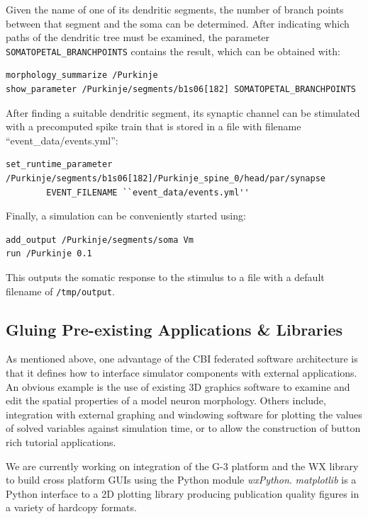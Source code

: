\documentclass[12pt]{article}
\begin{document}
Given the name of one of its dendritic segments, the number of branch
points between that segment and the soma can be determined. After
indicating which paths of the dendritic tree must be examined, the
parameter {\tt SOMATOPETAL\_BRANCHPOINTS} contains the result, which
can be obtained with:

{\footnotesize
\begin{verbatim}
morphology_summarize /Purkinje
show_parameter /Purkinje/segments/b1s06[182] SOMATOPETAL_BRANCHPOINTS
\end{verbatim}
}

After finding a suitable dendritic segment, its synaptic channel can
be stimulated with a precomputed spike train that is stored in a file
with filename ``event\_data/events.yml'':

{\footnotesize
\begin{verbatim}
set_runtime_parameter /Purkinje/segments/b1s06[182]/Purkinje_spine_0/head/par/synapse
        EVENT_FILENAME ``event_data/events.yml''
\end{verbatim}
}

Finally, a simulation can be conveniently started using:

{\footnotesize
\begin{verbatim}
add_output /Purkinje/segments/soma Vm
run /Purkinje 0.1
\end{verbatim}
}

This outputs the somatic response to the stimulus to a file with a
default filename of {\tt /tmp/output}.


\subsection{Gluing Pre-existing Applications \& Libraries}

As mentioned above, one advantage of the CBI federated software
architecture is that it defines how to interface simulator components
with external applications.  An obvious example is the use of existing
3D graphics software to examine and edit the spatial properties of a
model neuron morphology.  Others include, integration with external
graphing and windowing software for plotting the values of solved
variables against simulation time, or to allow the construction of
button rich tutorial applications.

We are currently working on integration of the G-3 platform and the WX
library to build cross platform GUIs using the Python module {\it
  wxPython}.  {\it matplotlib} is a Python interface to a 2D plotting
library producing publication quality figures in a variety of hardcopy
formats.
\end{document}
